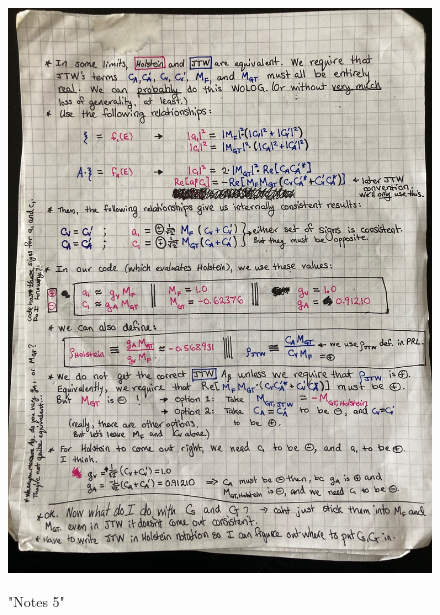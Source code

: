 \begin{figure}[htb]
	\centering
	{\includegraphics[width=.999\linewidth]
	{Figures/oldnotes_holstein_jtw/image5.jpg} }
	\caption{"Notes 5"}
	\label{fig:notes5}
\end{figure}






